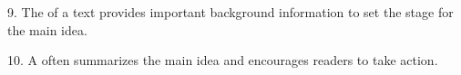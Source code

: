 \documentclass[12pt]{article}
\begin{document}
9. The \underline{\hspace{4cm}} of a text provides important background information to set the stage for the main idea.
\vspace{1cm}


10. A  \underline{\hspace{4cm}} often summarizes the main idea and encourages readers to take action.

\vspace{1cm}










\end{document}
